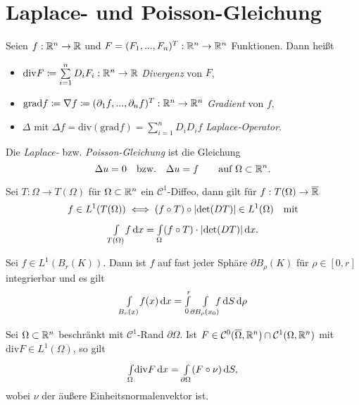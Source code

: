 \documentclass{cheat-sheet}
\newcommand{\grad}{\mathrm{grad}} %
\newcommand{\dive}{\mathrm{div}} %
\begin{document}
\section{Laplace- und Poisson-Gleichung}

\begin{nota}
  Seien $f : \mathbb{R}^n \to \mathbb{R}$ und $F = (F_1, ..., F_n)^T : \mathbb{R}^n \to \mathbb{R}^n$ Funktionen. Dann heißt
  \begin{itemize}
    \item $\dive F \coloneqq \sum_{i=1}^n D_i F_i : \R^n \to \R$ \emph{Divergenz} von $F$,
    \item $\grad f \coloneqq \nabla f \coloneqq (\partial_1 f, ..., \partial_n f)^T : \R^n \to \R^n$ \emph{Gradient} von $f$,
    \item $\Delta$ mit $\Delta f = \dive (\grad f) = \sum_{i=1}^n D_i D_i f$ \emph{Laplace-Operator}.
  \end{itemize}
\end{nota}

\begin{defn}
  Die \emph{Laplace-} bzw. \emph{Poisson-Gleichung} ist die Gleichung
  \[ \Delta u = 0 \quad \text{bzw.} \quad \Delta u = f \qquad \text{auf $\Omega \subset \mathbb{R}^n$}. \]
\end{defn}


\begin{satz}[Transformationssatz]
  Sei $T : \Omega \to T(\Omega)$ für $\Omega \subset \mathbb{R}^n$ ein $\mathcal{C}^1$-Diffeo, dann gilt für $f : T(\Omega) \to \overline{\mathbb{R}}$
  \[ f \in L^1(T(\Omega)) \iff (f \circ T) \circ \lvert\det(DT)\rvert \in L^1(\Omega) \quad \text{mit} \]
  \[ {\textstyle \int\limits_{T(\Omega)}^{}} f \,\mathrm{d} x = {\textstyle \int\limits_{\Omega}^{}} (f \circ T) \cdot \lvert\det(DT)\rvert \,\mathrm{d} x. \]
\end{satz}

\begin{bsp}[Polarkoordinaten]
  Sei $f \in L^1(B_r(K))$. Dann ist $f$ auf fast jeder Sphäre $\partial B_\rho(K)$ für $\rho \in \left[ 0, r \right]$ integrierbar und es gilt
  \[ {\textstyle \int\limits_{B_r(x)}^{}} f(x) \,\mathrm{d} x = {\textstyle \int\limits_{0}^{r}} {\textstyle \int\limits_{\partial B_\rho(x_0)}^{}} \!\!\!f \,\mathrm{d} S \,\mathrm{d} \rho \] %
\end{bsp}

\begin{satz}[Gauß]
  Sei $\Omega \subset \mathbb{R}^n$ beschränkt mit $\mathcal{C}^1$-Rand $\partial \Omega$. Ist $F \in \mathcal{C}^0(\overline{\Omega}, \mathbb{R}^n) \cap \mathcal{C}^1(\Omega, \mathbb{R}^n)$ mit $\dive F \in L^1(\Omega)$, so gilt
  \[ \Int{\Omega}{}{\dive F}{x} = \Int{\partial \Omega}{}{(F \circ \nu)}{S}, \]
  wobei $\nu$ der äußere Einheitsnormalenvektor ist.
\end{satz}
\end{document}

